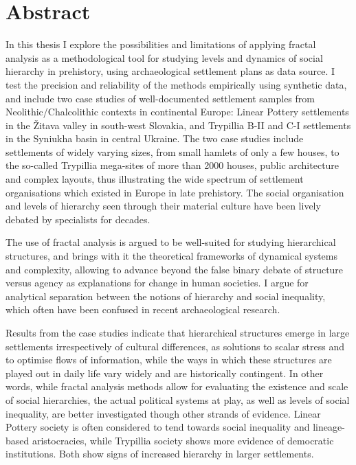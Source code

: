 \documentclass[
  12pt,
  a4paper, twoside]{book}
\author{}
\date{\vspace{-2.5em}}
\begin{document}
\begin{titlepage}

\newpage
\thispagestyle{empty}

\newpage
\end{titlepage}

%

\hypertarget{abstract}{%
\section*{Abstract}\label{abstract}}

In this thesis I explore the possibilities and limitations of applying fractal analysis as a methodological tool for studying levels and dynamics of social hierarchy in prehistory, using archaeological settlement plans as data source. I test the precision and reliability of the methods empirically using synthetic data, and include two case studies of well-documented settlement samples from Neolithic/Chalcolithic contexts in continental Europe: Linear Pottery settlements in the Žitava valley in south-west Slovakia, and Trypillia B-II and C-I settlements in the Syniukha basin in central Ukraine. The two case studies include settlements of widely varying sizes, from small hamlets of only a few houses, to the so-called Trypillia mega-sites of more than 2000 houses, public architecture and complex layouts, thus illustrating the wide spectrum of settlement organisations which existed in Europe in late prehistory. The social organisation and levels of hierarchy seen through their material culture have been lively debated by specialists for decades.

The use of fractal analysis is argued to be well-suited for studying hierarchical structures, and brings with it the theoretical frameworks of dynamical systems and complexity, allowing to advance beyond the false binary debate of structure versus agency as explanations for change in human societies. I argue for analytical separation between the notions of hierarchy and social inequality, which often have been confused in recent archaeological research.

Results from the case studies indicate that hierarchical structures emerge in large settlements irrespectively of cultural differences, as solutions to scalar stress and to optimise flows of information, while the ways in which these structures are played out in daily life vary widely and are historically contingent. In other words, while fractal analysis methods allow for evaluating the existence and scale of social hierarchies, the actual political systems at play, as well as levels of social inequality, are better investigated though other strands of evidence. Linear Pottery society is often considered to tend towards social inequality and lineage-based aristocracies, while Trypillia society shows more evidence of democratic institutions. Both show signs of increased hierarchy in larger settlements.
\end{document}
